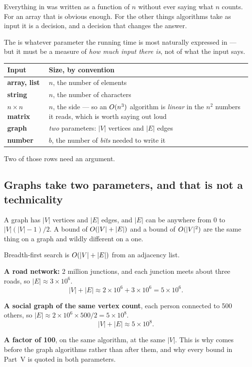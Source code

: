 Everything in  was written as a function of $n$ without ever saying
what $n$ counts. For an array that is obvious enough. For the other things
algorithms take as input it is a decision, and a decision that changes the
answer.

\begin{definitionbox}
The  is whatever parameter the running time is most naturally
expressed in --- but it must be a measure of \emph{how much input there is},
not of what the input says.

\medskip
{}
\begin{longtable}{@{}L{3.0cm}L{11.5cm}@{}}
\toprule
{}
\textbf{Input} & \textbf{Size, by convention} \\
\midrule
\endhead
\textbf{array, list} & $n$, the number of elements \\
\textbf{string} & $n$, the number of characters \\
\textbf{$n \times n$ matrix} & $n$, the side --- so an $O(n^{3})$ algorithm
  is \emph{linear} in the $n^{2}$ numbers it reads, which is worth saying out
  loud \\
\textbf{graph} & \emph{two} parameters: $|V|$ vertices and $|E|$ edges \\
\textbf{number} & $b$, the number of \emph{bits} needed to write it \\
\bottomrule
\end{longtable}
\end{definitionbox}

Two of those rows need an argument.

\subsection*{Graphs take two parameters, and that is not a technicality}

A graph has $|V|$ vertices and $|E|$ edges, and $|E|$ can be anywhere from $0$
to $|V|(|V|-1)/2$. A bound of $O(|V| + |E|)$ and a bound of
$O(|V|^{2})$ are the same thing on a  graph and wildly
different on a  one.

\begin{worked}
Breadth-first search is $O(|V| + |E|)$ from an adjacency list.

\smallskip
\textbf{A road network:} 2 million junctions, and each junction meets about
three roads, so $|E| \approx 3 \times 10^{6}$.
\[ |V| + |E| \approx 2\!\times\!10^{6} + 3\!\times\!10^{6} = 5 \times 10^{6}. \]

\smallskip
\textbf{A social graph of the same vertex count}, each person connected to
500 others, so $|E| \approx 2\!\times\!10^{6} \times 500 / 2 = 5 \times
10^{8}$.
\[ |V| + |E| \approx 5 \times 10^{8}. \]

\smallskip
\textbf{A factor of 100}, on the same algorithm, at the same $|V|$. This is
why  comes before the graph algorithms rather than after them,
and why every bound in Part~V is quoted in both parameters.
\end{worked}

